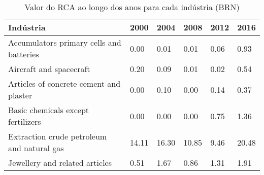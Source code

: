 \begin{table}
\centering
\caption{Valor do RCA ao longo dos anos para cada indústria (BRN)}
\label{tab:ex3-tempo-BRN}
\begin{tabular}{p{6cm}p{1.5cm}p{1.5cm}p{1.5cm}p{1.5cm}p{1.5cm}}
\toprule
                                 Indústria &  2000 &  2004 &  2008 & 2012 &  2016 \\
\midrule
  Accumulators primary cells and batteries &  0.00 &  0.01 &  0.01 & 0.06 &  0.93 \\
                   Aircraft and spacecraft &  0.20 &  0.09 &  0.01 & 0.02 &  0.54 \\
   Articles of concrete cement and plaster &  0.00 &  0.10 &  0.00 & 0.14 &  0.37 \\
        Basic chemicals except fertilizers &  0.00 &  0.00 &  0.00 & 0.75 &  1.36 \\
Extraction crude petroleum and natural gas & 14.11 & 16.30 & 10.85 & 9.46 & 20.48 \\
            Jewellery and related articles &  0.51 &  1.67 &  0.86 & 1.31 &  1.91 \\
\bottomrule
\end{tabular}
\end{table}
